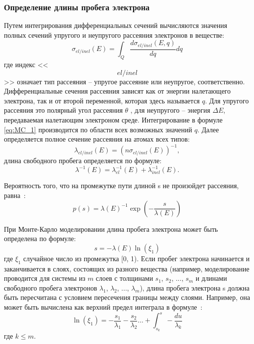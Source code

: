 \subsubsection{Определение длины пробега электрона}
Путем интегрирования дифференциальных сечений вычисляются значения полных сечений упругого и неупругого рассеяния электронов в веществе:
\begin{equation} \label{eq:MC_1}
	\sigma_{el/inel}(E) = \int_Q \frac{d \sigma_{el/inel}(E, q)}{dq} dq
\end{equation}
где индекс <<$$el/inel$$>> означает тип рассеяния -- упругое рассеяние или неупругое, соответственно. Дифференциальные сечения рассеяния зависят как от энергии налетающего электрона, так и от второй переменной, которая здесь называется $q$. Для упругого рассеяния это полярный угол рассеяния $\theta$ , для неупругого -- энергия $\Delta E$, передаваемая налетающим электроном среде. Интегрирование в формуле \ref{eq:MC_1} производится по области всех возможных значений $q$. Далее определяется полное сечение рассеяния на атомах всех типов:
\begin{equation} \label{eq:MC_3}
	\lambda_{el/inel}(E)=\left(n \sigma_{el/inel}(E)\right)^{-1},
\end{equation}
длина свободного пробега определяется по формуле:
\begin{equation} \label{eq:MC_4}
	\lambda^{-1}(E) = \lambda_{el}^{-1}(E)+\lambda_{inel}^{-1}(E).
\end{equation}

Вероятность того, что на промежутке пути длиной s не произойдет рассеяния, равна~\cite{ME_rev_49}:
\begin{equation} \label{eq:MC_5}
	p(s) = \lambda(E)^{-1} \exp \left(-\frac{s}{\lambda(E)}\right)
\end{equation}

При Монте-Карло моделировании длина пробега электрона может быть определена по формуле:
\begin{equation} \label{eq:MC_6}
	s = -\lambda(E) \ln \left(\xi_1\right)
\end{equation}
где $\xi_1$ случайное число из промежутка [0, 1). Если пробег электрона начинается и заканчивается в слоях, состоящих из разного вещества (например, моделирование проводится для системы из $m$ слоев с толщинами $s_1$, $s_2$, ..., $s_m$ и длинами свободного пробега электронов $\lambda_1$, $\lambda_2$, ..., $\lambda_m$), длина пробега электрона s должна быть пересчитана с условием пересечения границы между слоями. Например, она может быть вычислена как верхний предел интеграла в формуле~\cite{Han_2002}:
\begin{equation} \label{eq:MC_7}
	\ln \left(\xi_1\right)=-\frac{s_1}{\lambda_1}-\frac{s_2}{\lambda_2} \ldots+\int_{s_k}^s-\frac{d u}{\lambda_k}
\end{equation}
где $k \leq m$.

